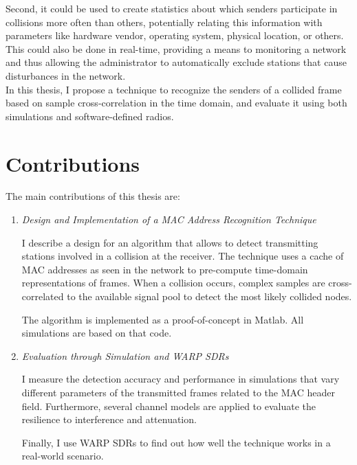 Second, it could be used to create statistics about which senders participate in collisions more often than others, potentially relating this information with parameters like hardware vendor, operating system, physical location, or others. This could also be done in real-time, providing a means to monitoring a network and thus allowing the administrator to automatically exclude stations that cause disturbances in the network.\\

In this thesis, I propose a technique to recognize the senders of a collided frame based on sample cross-correlation in the time domain, and evaluate it using both simulations and software-defined radios.

\clearpage



\section{Contributions}

The main contributions of this thesis are:

\begin{enumerate}
	\item \textit{Design and Implementation of a MAC Address Recognition Technique}

	I describe a design for an algorithm that allows to detect transmitting stations involved in a collision at the receiver. The technique uses a cache of \gls{MAC} addresses as seen in the network to pre-compute time-domain representations of frames. When a collision occurs, complex samples are cross-correlated to the available signal pool to detect the most likely collided nodes.

	The algorithm is implemented as a proof-of-concept in Matlab. All simulations are based on that code.

	\item \textit{Evaluation through Simulation and WARP SDRs}

	I measure the detection accuracy and performance in simulations that vary different parameters of the transmitted frames related to the \gls{MAC} header field. Furthermore, several channel models are applied to evaluate the resilience to interference and attenuation.

	Finally, I use \gls{WARP} \glspl{SDR} to find out how well the technique works in a real-world scenario.
\end{enumerate}


